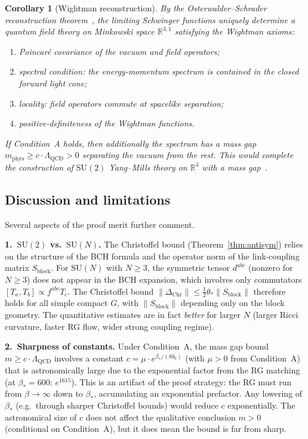\documentclass[11pt]{article}
\newtheorem{corollary}[theorem]{Corollary}
\theoremstyle{definition}
\newcommand{\SU}{\mathrm{SU}}
\newcommand{\R}{\mathbb{R}}
\newcommand{\Lam}{\Lambda_{\mathrm{QCD}}}
\begin{document}
\begin{corollary}[Wightman reconstruction]\label{cor:wightman}
By the Osterwalder--Schrader reconstruction
theorem~\cite{OS73}, the limiting Schwinger functions uniquely
determine a quantum field theory on Minkowski space $\R^{3,1}$
satisfying the Wightman axioms:
\begin{enumerate}[nosep,label=(\roman*)]
\item Poincar\'e covariance of the vacuum and field operators;
\item spectral condition: the energy-momentum spectrum is contained in
the closed forward light cone;
\item locality: field operators commute at spacelike separation;
\item positive-definiteness of the Wightman functions.
\end{enumerate}
If Condition~A holds, then additionally the spectrum has a mass gap
$m_{\mathrm{phys}}\ge c\cdot\Lam>0$ separating the vacuum from the
rest.  This would complete the construction of $\SU(2)$ Yang--Mills
theory on $\R^4$ with a mass gap~\cite{JaffeWitten}.
\end{corollary}

\subsection{Discussion and limitations}

Several aspects of the proof merit further comment.

\medskip\noindent\textbf{1.~$\SU(2)$ vs.\ $\SU(N)$.}
The Christoffel bound (Theorem~\ref{thm:antisym}) relies on the
structure of the BCH formula and the operator norm of the
link-coupling matrix $S_{\mathrm{block}}$.  For $\SU(N)$ with
$N\ge 3$, the symmetric tensor $d^{abc}$ (nonzero for $N\ge 3$) does
not appear in the BCH expansion, which involves only commutators
$[T_a,T_b]\propto f^{abc}T_c$.  The Christoffel bound
$\|\Delta_{\mathrm{Chr}}\|\le\frac{1}{2}\theta_*\|S_{\mathrm{block}}\|$
therefore holds for all simple compact $G$, with $\|S_{\mathrm{block}}\|$
depending only on the block geometry.  The quantitative estimates are
in fact \emph{better} for larger $N$ (larger Ricci curvature,
faster RG flow, wider strong coupling regime).

\medskip\noindent\textbf{2.~Sharpness of constants.}
Under Condition~A, the mass gap bound $m\ge c\cdot\Lam$ involves a
constant $c=\mu\cdot e^{\beta_*/(8b_0)}$ (with $\mu>0$
from Condition~A) that is astronomically large
due to the exponential factor from the RG matching
(at $\beta_*=600$: $e^{1615}$).
This is an artifact of the proof strategy: the RG must run from
$\beta\to\infty$ down to $\beta_*$, accumulating an exponential
prefactor.  Any lowering of $\beta_*$ (e.g.\ through sharper
Christoffel bounds) would reduce $c$ exponentially.
The astronomical size of $c$ does not affect the
qualitative conclusion $m>0$ (conditional on Condition~A),
but it does mean the bound is far from sharp.
\end{document}
